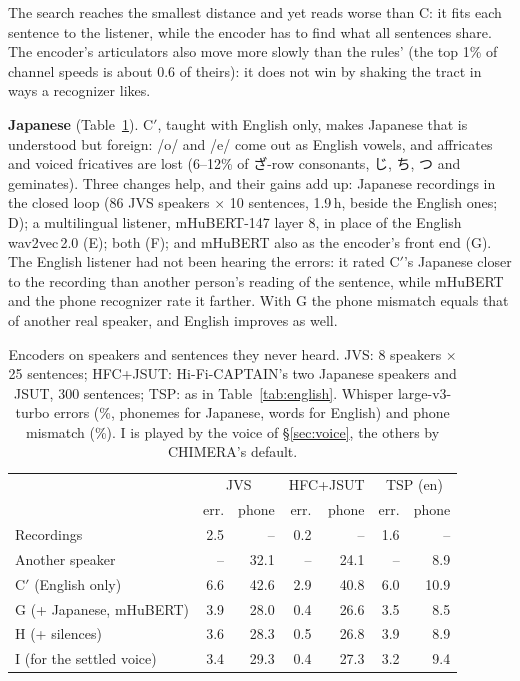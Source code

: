 \documentclass[10pt,a4paper,twocolumn]{article}
\begin{document}
The search reaches the smallest distance and yet reads worse than C: it fits each sentence to the
listener, while the encoder has to find what all sentences share. The encoder's articulators also
move more slowly than the rules' (the top 1\% of channel speeds is about 0.6 of theirs): it does
not win by shaking the tract in ways a recognizer likes.

\textbf{Japanese} (Table~\ref{tab:japanese}). C$'$, taught with English only, makes Japanese that
is understood but foreign: /o/ and /e/ come out as English vowels, and affricates and voiced
fricatives are lost (6--12\% of ざ-row consonants, じ, ち, つ and geminates). Three changes help,
and their gains add up: Japanese recordings in the closed loop (86 JVS speakers $\times$ 10
sentences, 1.9\,h, beside the English ones; D); a multilingual listener, mHuBERT-147 layer 8, in
place of the English wav2vec\,2.0 (E); both (F); and mHuBERT also as the encoder's front end (G).
The English listener had not been hearing the errors: it rated C$'$'s Japanese closer to the
recording than another person's reading of the sentence, while mHuBERT and the phone recognizer
rate it farther. With G the phone mismatch equals that of another real speaker, and English
improves as well.

\begin{table}[t]
\centering\footnotesize\setlength{\tabcolsep}{2.6pt}
\caption{Encoders on speakers and sentences they never heard. JVS: 8 speakers $\times$ 25
sentences; HFC+JSUT: Hi-Fi-CAPTAIN's two Japanese speakers and JSUT, 300 sentences; TSP: as in
Table~\ref{tab:english}. Whisper large-v3-turbo errors (\%, phonemes for Japanese, words for
English) and phone mismatch (\%). I is played by the voice of \S\ref{sec:voice}, the others by
CHIMERA's default.}
\label{tab:japanese}
\begin{tabular}{@{}lrrrrrr@{}}
\toprule
& \multicolumn{2}{c}{JVS} & \multicolumn{2}{c}{HFC+JSUT} & \multicolumn{2}{c}{TSP (en)}\\
& err. & phone & err. & phone & err. & phone\\
\midrule
Recordings & 2.5 & -- & 0.2 & -- & 1.6 & --\\
Another speaker & -- & 32.1 & -- & 24.1 & -- & 8.9\\
C$'$ (English only) & 6.6 & 42.6 & 2.9 & 40.8 & 6.0 & 10.9\\
G (+ Japanese, mHuBERT) & 3.9 & 28.0 & 0.4 & 26.6 & 3.5 & 8.5\\
H (+ silences) & 3.6 & 28.3 & 0.5 & 26.8 & 3.9 & 8.9\\
I (for the settled voice) & 3.4 & 29.3 & 0.4 & 27.3 & 3.2 & 9.4\\
\bottomrule
\end{tabular}
\end{table}
\end{document}
